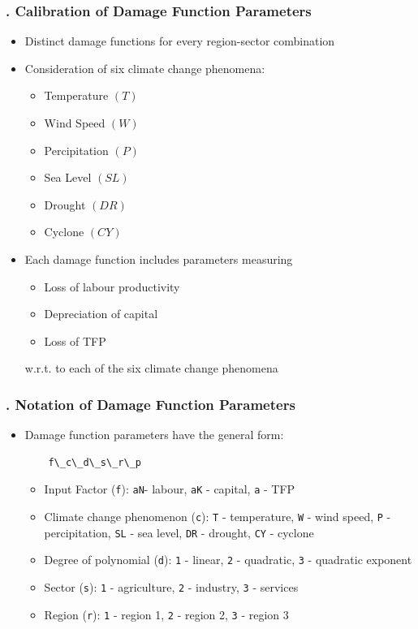 \documentclass[11pt,aspectratio=169]{beamer}
\begin{document}
\begin{frame}
\frametitle{{\thesection.\thesubsection} Calibration of Damage Function Parameters}
\begin{itemize}
\item Distinct damage functions for every region-sector combination 
\item Consideration of six climate change phenomena:
	\begin{itemize}
		\item Temperature $(T)$
		\item Wind Speed $(W)$
		\item Percipitation $(P)$
		\item Sea Level $(SL)$
		\item Drought $(DR)$
		\item Cyclone $(CY)$
	\end{itemize}
\item Each damage function includes parameters measuring 
	\begin{itemize}
		\item Loss of labour productivity 
		\item Depreciation of capital
		\item Loss of TFP
	\end{itemize}
w.r.t. to each of the six climate change phenomena
\end{itemize}
\end{frame}

\begin{frame}[fragile]
\frametitle{{\thesection.\thesubsection} Notation of Damage Function Parameters}
\begin{itemize}
\item Damage function parameters have the general form:
\begin{verbatim}
	f\_c\_d\_s\_r\_p
\end{verbatim}
\begin{itemize}
\item Input Factor (\texttt{f}): \texttt{aN}- labour, \texttt{aK} - capital, \texttt{a} - TFP
\item Climate change phenomenon (\texttt{c}): \texttt{T} - temperature, \texttt{W} - wind speed, \texttt{P} - percipitation, \texttt{SL} - sea level, \texttt{DR} - drought, \texttt{CY} - cyclone
\item Degree of polynomial (\texttt{d}): \texttt{1} - linear, \texttt{2} - quadratic, \texttt{3} - quadratic exponent
\item Sector (\texttt{s}): \texttt{1} - agriculture, \texttt{2} - industry, \texttt{3} - services
\item Region (\texttt{r}): \texttt{1} - region 1, \texttt{2} - region 2, \texttt{3} - region 3
\end{itemize}
\end{itemize}
\end{frame}
\end{document}
